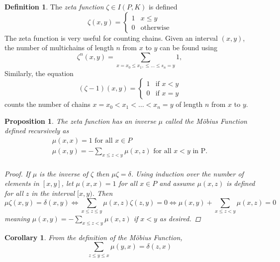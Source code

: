 \documentclass[psamsfonts]{amsart}
\newtheorem{cor}[thm]{Corollary}
\newtheorem{prop}[thm]{Proposition}
\theoremstyle{definition}
\newtheorem{defn}[thm]{Definition}
\theoremstyle{remark}
\numberwithin{equation}{section}
\begin{document}
\begin{defn}
The \textit{zeta function} $\zeta \in I(P,K)$ is defined
\begin{equation}\label{zeta_function}
    \zeta(x,y) =
    \begin{cases}
    1 & x\leq y\\
    0 & \text{otherwise}
    \end{cases}
\end{equation}
The zeta function is very useful for counting chains. Given an interval $(x,y)$, the number of multichains of length $n$ from $x$ to $y$ can be found using
\begin{equation*}\displaystyle\zeta^{n}(x,y)=\sum_{x=x_0\leq x_1,\leq \dots \leq s_n=y} 1,
\end{equation*} 
Similarly, the equation
\begin{equation*}
    (\zeta - 1)(x,y) = 
    \begin{cases}
    1 & \text{if $x < y$}\\
    0 & \text{if $x=y$}
    \end{cases}
\end{equation*}
counts the number of chains $x=x_0<x_1<\dots<x_n=y$ of length $n$ from $x$ to $y$. 
\end{defn}

\begin{prop}
The zeta function has an inverse $\mu$ called the \textit{M\"{o}bius Function} defined recursively as
\begin{equation}\label{mobius_function}
    \begin{array}{l}
    \mu(x,x)=1 \text{ for all } x\in P \\ 
    \mu(x,y)=-\displaystyle\sum_{x\leq z < y}\mu(x,z) \text{ for all } x<y \text{ in P.}\\
  \end{array}
\end{equation}
\begin{proof}
If $\mu$ is the inverse of $\zeta$ then $\mu\zeta = \delta$. Using induction over the number of elements in $[x,y]$, let $\mu(x,x)=1$ for all $x\in P$ and assume $\mu(x,z)$ is defined for all $z$ in the interval $[x,y)$. Then
\begin{equation}
\mu\zeta(x,y)=\delta(x,y) \iff \sum_{x\leq z \leq y}\mu(x,z)\zeta(z,y)=0 \iff \mu(x,y)+\sum_{x\leq z < y}\mu(x,z)=0 
\end{equation}
meaning $\mu(x,y)=-\displaystyle\sum_{x\leq z < y}\mu(x,z)$ if $x<y$ as desired. 
\end{proof}
\end{prop}
\begin{cor}
 From the definition of the M\"{o}bius Function, 
\begin{equation}\label{mobius_delta}
\sum_{z\leq y\leq x}\mu(y,x)=\delta(z,x)
\end{equation}
\end{cor}
\end{document}
